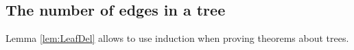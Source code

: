

\setcounter{section}{2}
\setcounter{subsection}{3}
\setcounter{dfn}{6}

\subsection{The number of edges in a tree}
Lemma \ref{lem:LeafDel} allows to use induction when proving theorems about trees.


